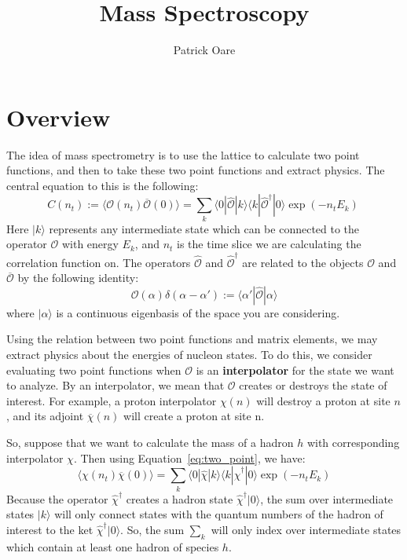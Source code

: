 \documentclass[11pt, oneside]{article}   	%
\title{Mass Spectroscopy}
\author{Patrick Oare}
\date{}							%
\theoremstyle{definition}
\begin{document}
\maketitle

\section{Overview}

The idea of mass spectrometry is to use the lattice to calculate two point functions, and then to take these 
two point functions and extract physics. The central equation to this is the following:
\begin{equation}
	C(n_t) := \langle\mathcal O(n_t)\overline{\mathcal O}(0)\rangle = \sum_k\langle 0|\hat{\mathcal O} 
	|k\rangle\langle k|\hat{\mathcal O}^\dagger |0\rangle\exp\left(-n_t E_k\right)~
	\label{eq:two_point}
\end{equation}
Here $|k\rangle$ represents any intermediate state which can be connected to the operator $\mathcal O$ 
with energy $E_k$, and $n_t$ is the time slice we are calculating the correlation function on. The operators 
$\hat{\mathcal O}$ and $\hat{\mathcal O}^\dagger$ are related to the objects $\mathcal O$ and 
$\overline{\mathcal O}$ by the following identity:
\begin{equation}
	\mathcal O(\alpha)\delta(\alpha - \alpha') := \langle \alpha' | \hat{\mathcal O} | \alpha\rangle
\end{equation}
where $|\alpha\rangle$ is a continuous eigenbasis of the space you are considering. 

Using the relation between two point functions and matrix elements, we may extract physics about the energies 
of nucleon states. To do this, we consider evaluating two point functions when $\mathcal O$ is an 
\textbf{interpolator} for the state we want to analyze. By an interpolator, we mean that $\mathcal O$ 
creates or destroys the state of interest. For example, a proton interpolator $\chi(n)$ will destroy a proton at 
site $n$, and its adjoint $\overline\chi(n)$ will create a proton at site n. 

So, suppose that we want to calculate the mass of a hadron $h$ with corresponding interpolator $\chi$. 
Then using Equation~\ref{eq:two_point}, we have:
\begin{equation}
	\langle\chi(n_t)\overline\chi(0)\rangle = \sum_k\langle 0 |\hat\chi |k\rangle\langle k |
	\hat{\chi}^\dagger |0\rangle\exp(-n_t E_k)
\end{equation}
Because the operator $\hat{\chi}^\dagger$ creates a hadron state $\hat{\chi}^\dagger|0\rangle$, the 
sum over intermediate states $|k\rangle$ will only connect states with the quantum numbers of the hadron of 
interest to the ket $\hat{\chi}^\dagger|0\rangle$. So, the sum $\sum_k$ will only index over intermediate 
states which contain at least one hadron of species $h$. 
\end{document}
